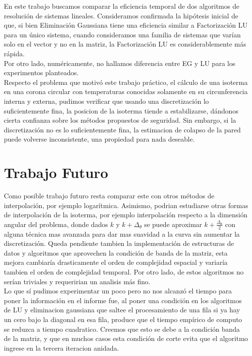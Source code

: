 
En este trabajo buscamos comparar la eficiencia temporal de dos algoritmos de resolución de sistemas lineales. Consideramos confirmada la hipótesis inicial de que, si bien Eliminación Gaussiana tiene una eficiencia similar a Factorización LU para un único sistema, cuando consideramos una familia de sistemas que varían solo en el vector y no en la matriz, la Factorización LU es considerablemente más rápida. \\

Por otro lado, numéricamente, no hallamos diferencia entre EG y LU para los experimentos planteados.\\

Respecto el problema que motivó este trabajo práctico, el cálculo de una isoterma en una corona circular con temperaturas conocidas solamente en su circunferencia interna y externa, pudimos verificar que usando una discretización lo suficientemente fina, la posicion de la isoterma tiende a estabilizarse, dándonos cierta confianza sobre los métodos propuestos de seguridad. Sin embargo, si la discretización no es lo suficientemente fina, la estimacion de colapso de la pared puede volverse inconsistente, una propiedad para nada deseable.\\

\section{Trabajo Futuro}
 Como posible trabajo futuro resta comparar este con otros métodos de interpolación, por ejemplo logarítmica. Asimismo, podrian estudiarse otras formas de interpolación de la isoterma, por ejemplo interpolación respecto a la dimensión angular del problema, donde dados $k$ y $k + \Delta_\theta$ se puede aproximar $k + \frac{\Delta_\theta}{2}$ con alguna técnica mas avanzada para dar mas suavidad a la curva sin aumentar la discretización. Queda pendiente tambien la implementación de estructuras de datos y algoritmos que aprovechen la condición de banda de la matriz, esta mejora cambiaría drasticamente el orden de complejidad espacial y variaría tambien el orden de complejidad temporal. Por otro lado, de estos algoritmos no serían triviales y requeririan un analisis más fino.\\
 
 Lo que sí pudimos experimentar un poco pero no nos alcanzó el tiempo para poner la información en el informe fue, al poner una condición en los algoritmos de LU y eliminacion gaussiana que saltee el procesamiento de una fila si ya hay un cero bajo la diagonal en esa fila, produce que el tiempo empírico de computo se reduzca a tiempo cuadratico. Creemos que esto se debe a la condición banda de la matriz, y que en muchos casos esta condición de corte evita que el algoritmo ingrese en la tercera iteracion anidada.